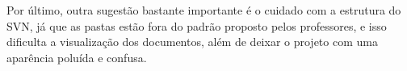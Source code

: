 Por último, outra sugestão bastante importante é o cuidado com a estrutura do SVN, já que as pastas estão fora do padrão proposto pelos professores, e isso dificulta a visualização dos documentos, além de deixar o projeto com uma aparência poluída e confusa.



